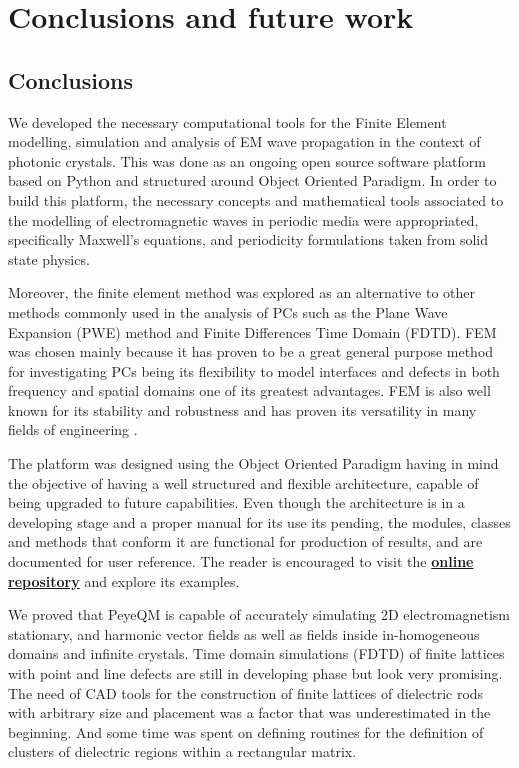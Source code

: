 \chapter{Conclusions and future work}

\section{Conclusions}

We developed the necessary computational tools for the Finite Element modelling, simulation and analysis of EM wave propagation in the context of photonic crystals.  This was done as an ongoing open source software platform based on Python and structured around Object Oriented Paradigm. 
In order to build this platform, the necessary concepts and mathematical tools associated to the modelling of electromagnetic waves in periodic media were appropriated, specifically Maxwell's equations, and periodicity formulations taken from solid state physics. 

Moreover, the finite element method was explored as an alternative to other methods commonly used in the analysis of PCs such as the Plane Wave Expansion (PWE) \cite{StevenJohnson2001} method and Finite Differences Time Domain (FDTD)\cite{Oskooi2009}. FEM was chosen mainly because it has proven to be a great general purpose method for investigating PCs \cite{Andonegui2013} being its flexibility to model interfaces and defects in both frequency and spatial domains one of its greatest advantages. FEM is also well known for its stability and robustness and has proven its versatility in many fields of engineering \cite{Bathe1996, Ram2002, Zienkiewicz2005, Logg2012}.

The platform was designed using the Object Oriented Paradigm having in mind the objective of having a well structured and flexible architecture, capable of being upgraded to future capabilities. Even though the architecture is in a developing stage and a proper manual for its use its pending, the modules, classes and methods that conform it are functional for production of results, and are documented for user reference. The reader is encouraged to visit the \href{https://github.com/bebopsan/peyeQM/tree/Depuration}{\textbf{online repository}}  and explore its examples.

We proved that PeyeQM is capable of accurately simulating  2D electromagnetism stationary, and harmonic vector fields as well as fields inside in-homogeneous domains and infinite crystals. Time domain simulations (FDTD) of finite lattices with point and line defects are still in developing phase but look very promising. The need of CAD tools for the construction of finite lattices of dielectric rods with arbitrary size and placement was a factor that was underestimated in the beginning. And some time was spent on defining routines for the definition of clusters of  dielectric regions within a rectangular matrix.      

